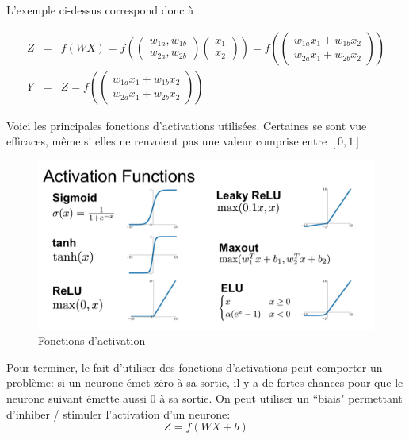 \documentclass[11pt,a4paper]{report}
\begin{document}
    \par L'exemple ci-dessus correspond donc à 
    
    \begin{eqnarray}
    Z &=& f(WX)  = f\left(\begin{pmatrix} w_{1a} , w_{1b} \\ w_{2a}, w_{2b} \end{pmatrix}\begin{pmatrix} x_1 \\ x_2 \end{pmatrix}\right) = f\left(\begin{pmatrix} w_{1a}x_1 + w_{1b}x_2 \\ w_{2a}x_1+w_{2b}x_2 \end{pmatrix}\right) \\
    Y &=& Z = f\left(\begin{pmatrix} w_{1a}x_1 + w_{1b}x_2 \\ w_{2a}x_1+w_{2b}x_2 \end{pmatrix}\right)
    \end{eqnarray}
    
    \newpage
    \par Voici les principales fonctions d'activations utilisées. Certaines se sont vue efficaces, même si elles ne renvoient pas une valeur comprise entre $[0,1]$ 
    
    \begin{figure}[!h]
    \center
    \includegraphics[scale=0.22]{ressources/activation_functions.png}
    \caption{Fonctions d'activation}
    \end{figure} 
    
    \par Pour terminer, le fait d'utiliser des fonctions d'activations peut comporter un problème: si un neurone émet zéro à sa sortie, il y a de fortes chances pour que le neurone suivant émette aussi 0 à sa sortie. On peut utiliser un ``biais" permettant d'inhiber / stimuler l'activation d'un neurone: 
    $$Z = f(WX+b)$$
    
\end{document}
